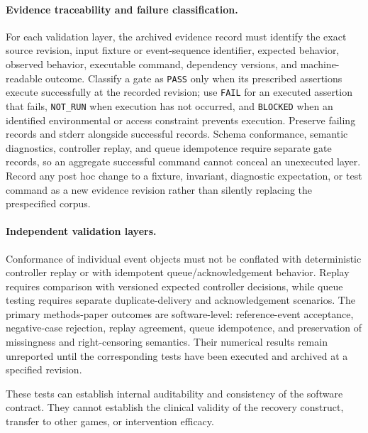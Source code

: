 \paragraph{Evidence traceability and failure classification.}
For each validation layer, the archived evidence record must identify the exact source revision, input fixture or event-sequence identifier, expected behavior, observed behavior, executable command, dependency versions, and machine-readable outcome. Classify a gate as \texttt{PASS} only when its prescribed assertions execute successfully at the recorded revision; use \texttt{FAIL} for an executed assertion that fails, \texttt{NOT\_RUN} when execution has not occurred, and \texttt{BLOCKED} when an identified environmental or access constraint prevents execution. Preserve failing records and stderr alongside successful records. Schema conformance, semantic diagnostics, controller replay, and queue idempotence require separate gate records, so an aggregate successful command cannot conceal an unexecuted layer. Record any post hoc change to a fixture, invariant, diagnostic expectation, or test command as a new evidence revision rather than silently replacing the prespecified corpus.

\paragraph{Independent validation layers.}
Conformance of individual event objects must not be conflated with deterministic controller replay or with idempotent queue/acknowledgement behavior. Replay requires comparison with versioned expected controller decisions, while queue testing requires separate duplicate-delivery and acknowledgement scenarios. The primary methods-paper outcomes are software-level: reference-event acceptance, negative-case rejection, replay agreement, queue idempotence, and preservation of missingness and right-censoring semantics. Their numerical results remain unreported until the corresponding tests have been executed and archived at a specified revision.

These tests can establish internal auditability and consistency of the software contract. They cannot establish the clinical validity of the recovery construct, transfer to other games, or intervention efficacy.

